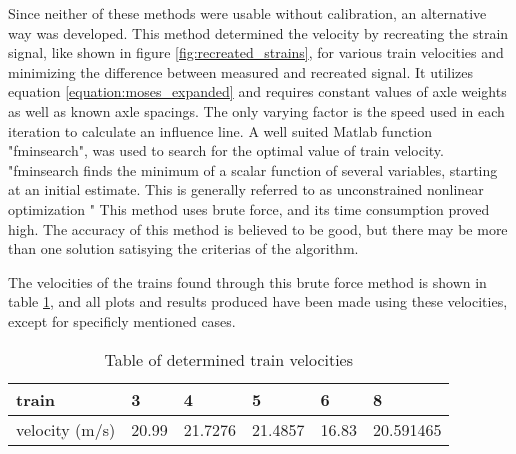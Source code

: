 Since neither of these methods were usable without calibration, an alternative way was developed. This method determined the velocity by recreating the strain signal, like shown in figure \ref{fig:recreated_strains}, for various train velocities and minimizing the difference between measured and recreated signal. It utilizes equation \ref{equation:moses_expanded} and requires constant values of axle weights as well as known axle spacings. The only varying factor is the speed used in each iteration to calculate an influence line. A well suited Matlab function "fminsearch", was used to search for the optimal value of train velocity. "fminsearch finds the minimum of a scalar function of several variables, starting at an initial estimate. This is generally referred to as unconstrained nonlinear optimization \cite{fminsearch}" This method uses brute force, and its time consumption proved high. The accuracy of this method is believed to be good, but there may be more than one solution satisying the criterias of the algorithm.

The velocities of the trains found through this brute force method is shown in table \ref{table:speeds}, and all plots and results produced have been made using these velocities, except for specificly mentioned cases.
\begin{table}[h]
	\centering
	\begin{tabularx}{\textwidth}{ |X|X|X|X|X|X| }
		\hline
		train & 3 & 4 & 5 & 6 & 8 \\
		\hline
		velocity (m/s) & 20.99 & 21.7276	&21.4857 & 16.83 &	20.591465  \\
		\hline
	\end{tabularx}
	\caption{Table of determined train velocities}
	\label{table:speeds}
\end{table}



